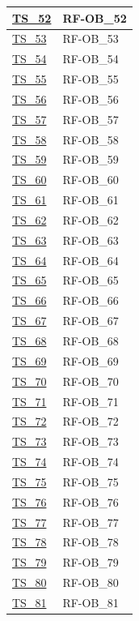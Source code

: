 \begin{longtable}{|
		>{\raggedright\arraybackslash}p{} |
		>{\centering\arraybackslash}p{} |
	}
	\hyperlink{ts-52}{TS\_52} & RF-OB\_52 \\ \hline
	\hyperlink{ts-53}{TS\_53} & RF-OB\_53 \\ \hline
	\hyperlink{ts-54}{TS\_54} & RF-OB\_54 \\ \hline
	\hyperlink{ts-55}{TS\_55} & RF-OB\_55 \\ \hline
	\hyperlink{ts-56}{TS\_56} & RF-OB\_56 \\ \hline
	\hyperlink{ts-57}{TS\_57} & RF-OB\_57 \\ \hline
	\hyperlink{ts-58}{TS\_58} & RF-OB\_58 \\ \hline
	\hyperlink{ts-59}{TS\_59} & RF-OB\_59 \\ \hline
	\hyperlink{ts-60}{TS\_60} & RF-OB\_60 \\ \hline
	\hyperlink{ts-61}{TS\_61} & RF-OB\_61 \\ \hline
	\hyperlink{ts-62}{TS\_62} & RF-OB\_62 \\ \hline
	\hyperlink{ts-63}{TS\_63} & RF-OB\_63 \\ \hline
	\hyperlink{ts-64}{TS\_64} & RF-OB\_64 \\ \hline
	\hyperlink{ts-65}{TS\_65} & RF-OB\_65 \\ \hline
	\hyperlink{ts-66}{TS\_66} & RF-OB\_66 \\ \hline
	\hyperlink{ts-67}{TS\_67} & RF-OB\_67 \\ \hline
	\hyperlink{ts-68}{TS\_68} & RF-OB\_68 \\ \hline
	\hyperlink{ts-69}{TS\_69} & RF-OB\_69 \\ \hline
	\hyperlink{ts-70}{TS\_70} & RF-OB\_70 \\ \hline
	\hyperlink{ts-71}{TS\_71} & RF-OB\_71 \\ \hline
	\hyperlink{ts-72}{TS\_72} & RF-OB\_72 \\ \hline
	\hyperlink{ts-73}{TS\_73} & RF-OB\_73 \\ \hline
	\hyperlink{ts-74}{TS\_74} & RF-OB\_74 \\ \hline
	\hyperlink{ts-75}{TS\_75} & RF-OB\_75 \\ \hline
	\hyperlink{ts-76}{TS\_76} & RF-OB\_76 \\ \hline
	\hyperlink{ts-77}{TS\_77} & RF-OB\_77 \\ \hline
	\hyperlink{ts-78}{TS\_78} & RF-OB\_78 \\ \hline
	\hyperlink{ts-79}{TS\_79} & RF-OB\_79 \\ \hline
	\hyperlink{ts-80}{TS\_80} & RF-OB\_80 \\ \hline
	\hyperlink{ts-81}{TS\_81} & RF-OB\_81 \\ \hline

\end{longtable}
